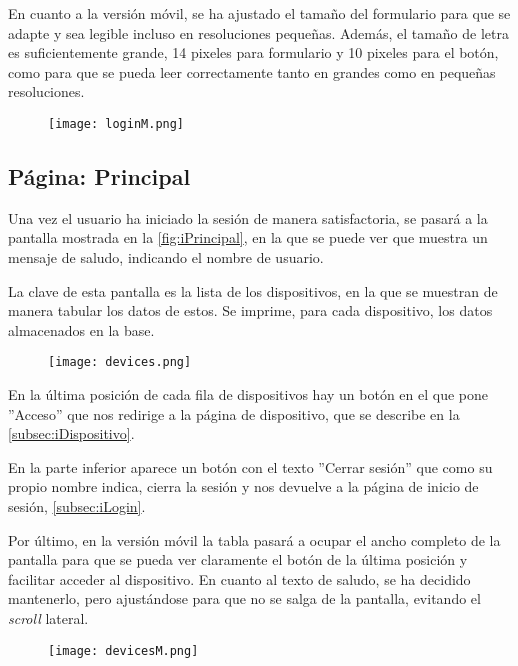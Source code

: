En cuanto a la versión móvil, se ha ajustado el tamaño del formulario para que se adapte y sea legible incluso en resoluciones pequeñas. Además, el tamaño de letra es suficientemente grande, 14 pixeles para formulario y 10 pixeles para el botón, como para que se pueda leer correctamente tanto en grandes como en pequeñas resoluciones.
\begin{figure}[H]
	{\texttt{[image: loginM.png]}}
\end{figure}

\subsection{Página: Principal}\label{subsec:iPrincipal}
Una vez el usuario ha iniciado la sesión de manera satisfactoria, se pasará a la pantalla mostrada en la \autoref{fig:iPrincipal}, en la que se puede ver que muestra un mensaje de saludo, indicando el nombre de usuario.

La clave de esta pantalla es la lista de los dispositivos, en la que se muestran de manera tabular los datos de estos. Se imprime, para cada dispositivo, los datos almacenados en la base.
\vspace{.5cm}
\begin{figure}[H]
	{\texttt{[image: devices.png]}}
\end{figure}
En la última posición de cada fila de dispositivos hay un botón en el que pone ''Acceso'' que nos redirige a la página de dispositivo, que se describe en la \autoref{subsec:iDispositivo}.

En la parte inferior aparece un botón con el texto ''Cerrar sesión'' que como su propio nombre indica, cierra la sesión y nos devuelve a la página de inicio de sesión, \autoref{subsec:iLogin}.

Por último, en la versión móvil la tabla pasará a ocupar el ancho completo de la pantalla para que se pueda ver claramente el botón de la última posición y facilitar acceder al dispositivo. En cuanto al texto de saludo, se ha decidido mantenerlo, pero ajustándose para que no se salga de la pantalla, evitando el \textit{scroll} lateral.
\vspace{.5cm}
\begin{figure}[H]
	{\texttt{[image: devicesM.png]}}
\end{figure}

